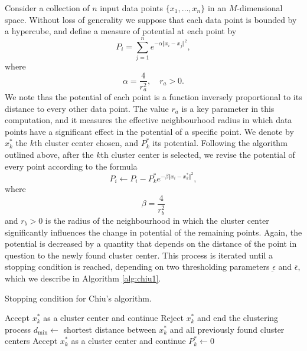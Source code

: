 Consider a collection of $n$ input data points $\{x_1,\dots,x_n\}$ in an $M$-dimensional space. Without loss of generality we suppose that each data point is bounded by a hypercube, and define a measure of potential at each point by
\begin{equation} \label{eq:chiu-pot}
P_i = \sum_{j=1}^n e^{-\alpha \Vert x_i-x_j \Vert^2},
\end{equation}
where
\[
\alpha = \frac{4}{r_a^2}, \quad r_a > 0.
\]
We note thas the potential of each point is a function inversely proportional to its distance to every other data point. The value $r_a$ is a key parameter in this computation, and it measures the effective neighbourhood radius in which data points have a significant effect in the potential of a specific point. We denote by $x_k^\ast$ the $k$th cluster center chosen, and $P_k^\ast$ its potential. Following the algorithm outlined above, after the $k$th cluster center is selected, we revise the potential of every point according to the formula
\[
P_i \leftarrow P_i - P_k^\ast e^{-\beta \Vert x_i - x_k^\ast \Vert^2},
\]
where
\[
\beta = \frac{4}{r_b^2}
\]
and $r_b>0$ is the radius of the neighbourhood in which the cluster center significantly influences the change in potential of the remaining points. Again, the potential is decreased by a quantity that depends on the distance of the point in question to the newly found cluster center. This process is iterated until a stopping condition is reached, depending on two thresholding parameters $\underbar{\epsilon}$ and $\overbar{\epsilon}$, which we describe in Algorithm \ref{alg:chiu1}.

\begin{algorithm}
  \caption{Stopping condition for Chiu's algorithm.}
    \label{alg:chiu1}
  \begin{algorithmic}
      \State Accept $x_k^\ast$ as a cluster center and continue
      \State Reject $x_k^\ast$ and end the clustering process
    \Else
      \State $d_{\text{min}}\gets$ shortest distance between $x_k^\ast$ and all previously found cluster centers
        \State Accept $x_k^\ast$ as a cluster center and continue
      \Else
        \State$P_k^\ast \gets 0$
      \EndIf
  \EndIf
  \end{algorithmic}
\end{algorithm}


